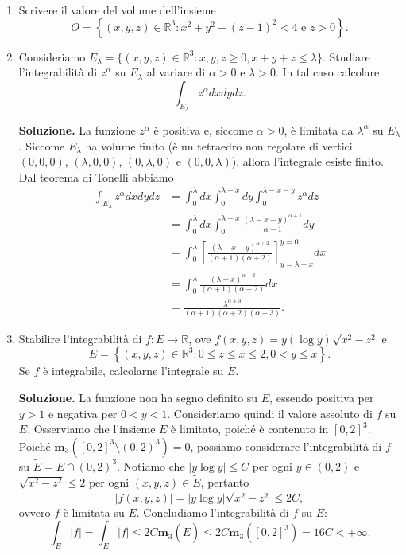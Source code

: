 \begin{enumerate}
	\item Scrivere il valore del volume dell'insieme
	\[
	O = \left\{(x,y,z) \in \mathbb{R}^3 : x^2 + y^2 + (z - 1)^2 < 4 \text{ e } z > 0\right\}.
	\]
	
	\item Consideriamo $E_{\lambda} = \{(x,y,z) \in \mathbb{R}^3 : x,y,z \geq 0, x + y + z \leq \lambda\}$. Studiare l'integrabilità di $z^{\alpha}$ su $E_{\lambda}$ al variare di $\alpha > 0$ e $\lambda > 0$. In tal caso calcolare
	\[
	\int_{E_{\lambda}} z^{\alpha} dx dy dz.
	\]
	
	\textbf{Soluzione.}
		La funzione $z^{\alpha}$ è positiva e, siccome $\alpha > 0$, è limitata da $\lambda^{\alpha}$ su $E_{\lambda}$. Siccome $E_{\lambda}$ ha volume finito (è un tetraedro non regolare di vertici $(0,0,0)$, $(\lambda,0,0)$, $(0,\lambda,0)$ e $(0,0,\lambda)$), allora l'integrale esiste finito. Dal teorema di Tonelli abbiamo
		\[
		\begin{aligned}
			\int_{E_{\lambda}} z^{\alpha} dx dy dz &= \int_0^{\lambda} dx \int_0^{\lambda - x} dy \int_0^{\lambda - x - y} z^{\alpha} dz \\
			&= \int_0^{\lambda} dx \int_0^{\lambda - x} \frac{(\lambda - x - y)^{\alpha + 1}}{\alpha + 1} dy \\
			&= \int_0^{\lambda} \left[\frac{(\lambda - x - y)^{\alpha + 2}}{(\alpha + 1)(\alpha + 2)}\right]_{y = \lambda - x}^{y = 0} dx \\
			&= \int_0^{\lambda} \frac{(\lambda - x)^{\alpha + 2}}{(\alpha + 1)(\alpha + 2)} dx \\
			&= \frac{\lambda^{\alpha + 3}}{(\alpha + 1)(\alpha + 2)(\alpha + 3)}.
		\end{aligned}
		\]
	
	
	\item Stabilire l'integrabilità di $f: E \to \mathbb{R}$, ove $f(x,y,z) = y (\log y) \sqrt{x^2 - z^2}$ e
	\[
	E = \left\{(x,y,z) \in \mathbb{R}^3 : 0 \leq z \leq x \leq 2, 0 < y \leq x\right\}.
	\]
	Se $f$ è integrabile, calcolarne l'integrale su $E$.
	
	\textbf{Soluzione.}
		La funzione non ha segno definito su $E$, essendo positiva per $y > 1$ e negativa per $0 < y < 1$. Consideriamo quindi il valore assoluto di $f$ su $E$. Osserviamo che l'insieme $E$ è limitato, poiché è contenuto in $[0,2]^3$. Poiché $\mathbf{m}_3([0,2]^3 \setminus (0,2)^3) = 0$, possiamo considerare l'integrabilità di $f$ su $\widetilde{E} = E \cap (0,2)^3$. Notiamo che $|y \log y| \leq C$ per ogni $y \in (0,2)$ e $\sqrt{x^2 - z^2} \leq 2$ per ogni $(x,y,z) \in \widetilde{E}$, pertanto
		\[
		|f(x,y,z)| = |y \log y| \sqrt{x^2 - z^2} \leq 2C,
		\]
		ovvero $f$ è limitata su $\widetilde{E}$. Concludiamo l'integrabilità di $f$ su $E$:
		\[
		\int_E |f| = \int_{\widetilde{E}} |f| \leq 2C \mathbf{m}_3(\widetilde{E}) \leq 2C \mathbf{m}_3([0,2]^3) = 16C < +\infty.
		\]
		

\end{enumerate}
